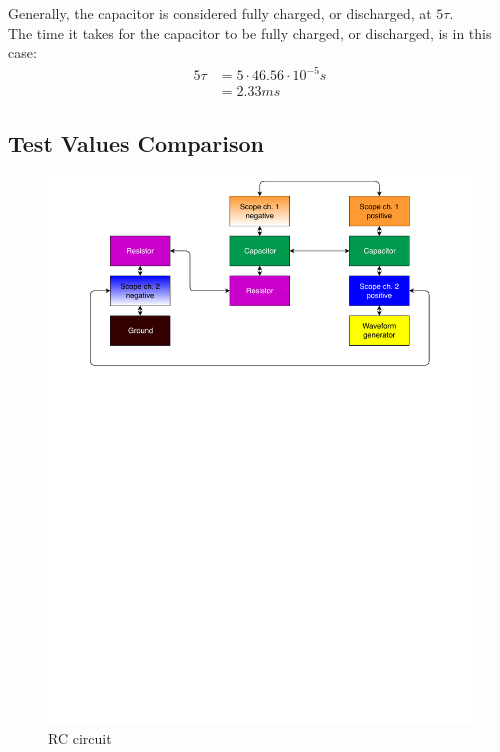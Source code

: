 \noindent Generally, the capacitor is considered fully charged, or discharged, at $5\tau$. \\
The time it takes for the capacitor to be fully charged, or discharged, is in this case:
\begin{align*}
5\tau &= 5 \cdot 46.56 \cdot 10^{-5} s \\
&= 2.33 ms
\end{align*}

\subsection{Test Values Comparison}
\begin{figure}[H]
	\center
		\includegraphics[clip, trim=0cm 18cm 0cm 0cm, scale=0.6]{fig/img/test_circuit_1}
	\caption{RC circuit}
	\label{rc_flow}
\end{figure}
